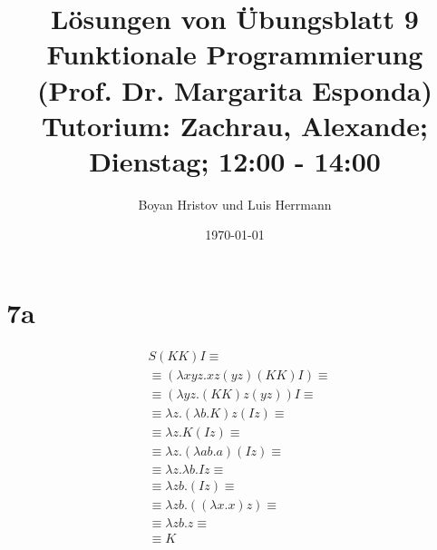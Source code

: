 \documentclass[11]{article}
\begin{document}
\title
{
L\"osungen von \"Ubungsblatt 9 \\
Funktionale Programmierung (Prof. Dr. Margarita Esponda) \\
\normalsize Tutorium: Zachrau, Alexande; Dienstag; 12:00 - 14:00
}
\author{Boyan Hristov und Luis Herrmann}
\date{\today}
\maketitle

\section*{7a}

\begin{align*}
& S(KK)I \equiv \tag*{S Anwenden} \\
& \equiv (\lambda xyz.xz(yz)(KK)I) \equiv \tag*{Vereinfachen} \\
& \equiv (\lambda yz.(KK)z(yz))I \equiv \tag*{Vereinfachen} \\
& \equiv \lambda z.(\lambda b.K)z(Iz) \equiv \tag*{Vereinfachen} \\
& \equiv \lambda z.K(Iz) \equiv \tag*{K Anwenden} \\
& \equiv \lambda z.(\lambda ab.a)(Iz) \equiv \tag*{Vereinfachen} \\
& \equiv \lambda z. \lambda b.Iz \equiv \tag*{Vereinfachen} \\
& \equiv \lambda zb.(Iz) \equiv \tag*{I Anwenden} \\
& \equiv \lambda zb.((\lambda x.x)z) \equiv \tag*{Vereinfachen} \\
& \equiv \lambda zb.z \equiv \tag*{K Anwenden} \\
& \equiv K
\end{align*}
\end{document}
